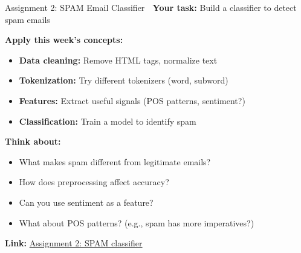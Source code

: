 \documentclass[aspectratio=169]{beamer}
\begin{document}
\begin{frame}[shrink=10]{Assignment 2: SPAM Email Classifier 📧}
    \textbf{Your task:} Build a classifier to detect spam emails

    \vspace{0.5em}
    \textbf{Apply this week's concepts:}
    \begin{itemize}\setlength{\itemsep}{0pt}
        \item \textbf{Data cleaning:} Remove HTML tags, normalize text
        \item \textbf{Tokenization:} Try different tokenizers (word, subword)
        \item \textbf{Features:} Extract useful signals (POS patterns, sentiment?)
        \item \textbf{Classification:} Train a model to identify spam
    \end{itemize}

    \vspace{0.5em}
    \textbf{Think about:}
    \begin{itemize}\setlength{\itemsep}{0pt}
        \item What makes spam different from legitimate emails?
        \item How does preprocessing affect accuracy?
        \item Can you use sentiment as a feature?
        \item What about POS patterns? (e.g., spam has more imperatives?)
    \end{itemize}

    \vspace{0.5em}
    \textbf{Link:} \href{https://github.com/ContextLab/llm-course/tree/main/assignments/Assignment\%202\%3A\%20SPAM\%20classifier}{Assignment 2: SPAM classifier}
\end{frame}
\end{document}

